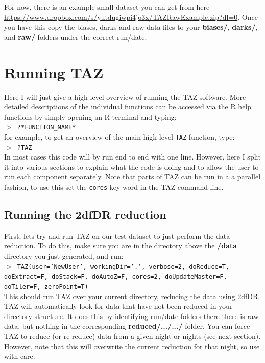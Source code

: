 \documentclass[12pt]{article}
\begin{document}
For now, there is an example small dataset you can get from here \url{https://www.dropbox.com/s/yutdugiwpi4jo3x/TAZRawExample.zip?dl=0}. Once you have this copy the biases, darks and raw data files to your \textbf{biases/}, \textbf{darks/}, and \textbf{raw/} folders under the correct run/date.  

\section{Running TAZ}

Here I will just give a high level overview of running the TAZ software. More detailed descriptions of the individual functions can be accessed via the R help functions by simply opening an R terminal and typing: \\

\hspace{10mm}  \texttt{$>$ ?*FUNCTION\_NAME*}\\

for example, to get an overview of the main high-level \texttt{TAZ} function, type:\\

\hspace{10mm}  \texttt{$>$ ?TAZ}\\

In most cases this code will by run end to end with one line. However, here I split it into various sections to explain what the code is doing and to allow the user to run each component separately. Note that parts of TAZ can be run in a a parallel fashion, to use this set the \texttt{cores} key word in the TAZ command line.

\subsection{Running the 2dfDR reduction}

First, lets try and run TAZ on our test dataset to just perform the data reduction. To do this, make sure you are in the directory above the \textbf{/data} directory you just generated, and run:\\

\hspace{10mm} \texttt{$>$ TAZ(user='NewUser', workingDir='.', verbose=2, doReduce=T, doExtract=F, doStack=F, doAutoZ=F, cores=2, doUpdateMaster=F, doTiler=F, zeroPoint=T)}\\

This should run TAZ over your current directory, reducing the data using 2dfDR. TAZ will automatically look for data that have not been reduced in your directory structure. It does this by identifying run/date folders there there is raw data, but nothing in the corresponding \textbf{reduced/.../.../} folder. You can force TAZ to reduce (or re-reduce) data from a given night or nights (see next section). However, note that this will overwrite the current reduction for that night, so use with care. 
\end{document}
